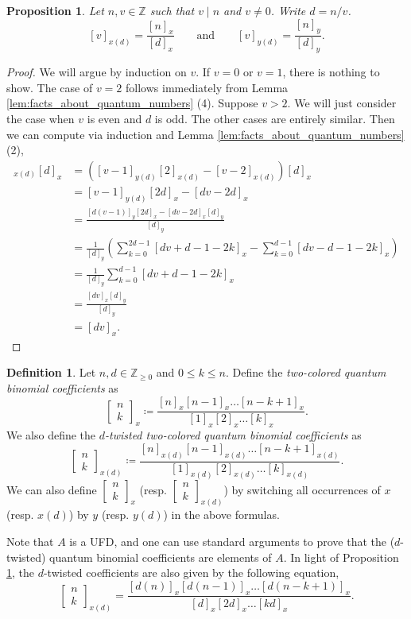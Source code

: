 \documentclass{amsart}
\newcommand{\Z}{\mathbb{Z}}
\renewcommand{\binom}[2]{\begin{bmatrix} #1 \\ #2 \end{bmatrix}}
\newtheorem{proposition}[subsubsection]{Proposition}
\theoremstyle{definition}
\newtheorem{definition}[subsubsection]{Definition}
\numberwithin{equation}{subsection}
\begin{document}
\begin{proposition}\label{prop:twisted_vars_and_two_color}
    Let $n,v \in \Z$ such that $v \mid n$ and $v \neq 0$. Write $d = n/v$.
    \begin{equation}\label{eq:prop_twisted_vars_and_two_color_1} 
        [v]_{x(d)} = \frac{[n]_x}{[d]_x} \qquad \text{and} \qquad [v]_{y(d)} = \frac{[n]_y}{[d]_y}. 
    \end{equation}
\end{proposition}
\begin{proof}
    We will argue by induction on $v$. If $v= 0$ or $v=1$, there is nothing to show.
    The case of $v=2$ follows immediately from Lemma \ref{lem:facts_about_quantum_numbers} (4).
    Suppose $v > 2$. We will just consider the case when $v$ is even and $d$ is odd. The other cases are entirely similar.
    Then we can compute via induction and Lemma \ref{lem:facts_about_quantum_numbers} (2), 
    \begin{align*}
        [v]_{x(d)} [d]_x &= ([v-1]_{y (d)} [2]_{x(d)} - [v-2]_{x(d)}) [d]_x \\
        &= [v-1]_{y(d)} [2d]_{x} - [dv-2d]_x \\
        &= \frac{[d(v-1)]_y [2d]_x - [dv-2d]_x [d]_y}{[d]_y} \\
        &= \frac{1}{[d]_y} \left( \sum_{k=0}^{2d-1} [dv+d-1-2k]_x -  \sum_{k=0}^{d-1} [dv-d-1-2k]_x \right)  \\
        &= \frac{1}{[d]_y} \sum_{k=0}^{d-1} [dv+d-1-2k]_x \\
        &= \frac{[dv]_x [d]_y}{[d]_y} \\
        &= [dv]_x.
    \end{align*}
\end{proof}

\begin{definition}
    Let $n,d \in \Z_{\geq 0}$ and $0 \leq k \leq n$. Define the \emph{two-colored quantum binomial coefficients} as
    \begin{equation}
        \binom{n}{k}_x \coloneq \frac{[n]_x [n-1]_x \ldots [n-k+1]_x}{[1]_x [2]_x \ldots [k]_x}.
    \end{equation}
    We also define the \emph{$d$-twisted two-colored quantum binomial coefficients} as
    \begin{equation}
        \binom{n}{k}_{x(d)} \coloneq \frac{[n]_{x(d)} [n-1]_{x(d)} \ldots [n-k+1]_{x(d)}}{[1]_{x(d)} [2]_{x(d)} \ldots [k]_{x(d)}}.
    \end{equation}
    We can also define $\binom{n}{k}_x$ (resp. $\binom{n}{k}_{x(d)}$) by switching all occurrences of $x$ (resp. $x(d)$) by $y$ (resp. $y(d)$) in the above formulas.
\end{definition}
Note that $A$ is a UFD, and one can use standard arguments to prove that the ($d$-twisted) quantum binomial coefficients are elements of $A$.
In light of Proposition \ref{prop:twisted_vars_and_two_color}, the $d$-twisted coefficients are also given by the following equation,
\begin{equation}\label{eq:cor_of_twisted_vars_and_two_color}
    \binom{n}{k}_{x(d)} =\frac{[d(n)]_{x} [d(n-1)]_{x} \ldots [d(n-k+1)]_{x}}{[d]_{x} [2d]_{x} \ldots [kd]_{x}}.
\end{equation}
\end{document}
